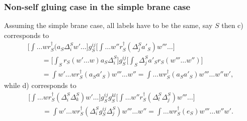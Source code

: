 \documentclass[pdftex]{sigma}
\def\idagger{r^{\dagger}}
\def\res{r}
\begin{document}
\subsubsection{Non-self gluing case in the simple brane case}

Assuming the simple brane case, all labels have to be the same, say
$S$ then c) corresponds to
\begin{gather*}
\bigg[\int \dots w  \idagger_{S}(a_S \Delta^{S}_i  w'\dots\bigg]  g^{ij}_{S}
\bigg[\int  \dots w'' \idagger_S (\Delta_j^{S}a'_S) w''' \dots\bigg]  \\
\qquad{} = \bigg[\int_S \res _S (w' \dots w) a_S \Delta^{S}_i \bigg] g^{ij}_{S}
\bigg[\int_S  \Delta_j^{S}a'_S \res_S( w''' \dots w'')\bigg]\\
\qquad{} = \int w' \dots w \idagger_S (a_S a'_S)  w''' \dots w''
 =  \int \dots w \idagger_S(a_S a'_S)  w'''  \dots w'' w',
\end{gather*}
while d) corresponds to
\begin{gather*}
\bigg[\int \dots w  \idagger_{S}(\Delta^{S}_i  \Delta^{S}_{k}) w'\dots \bigg] g^{ij}_{S}g^{kl}_{S}
 \bigg[\int  \dots w'' \idagger_{S}( \Delta_l^{S} \Delta_j^{S}) w''' \dots \bigg]  \\
\qquad{} = \int w' \dots w \idagger_S (\Delta_i^S g_S^{ij}\Delta_j^S)  w''' \dots w''
 = \int \dots w \idagger_S(e_S)  w'''  \dots w'' w'.
\end{gather*}
\end{document}
